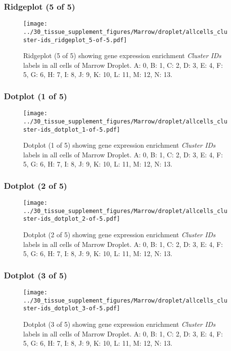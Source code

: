 \clearpage

\subsubsection{Ridgeplot (5 of 5)}
\begin{figure}[h]
\centering
\texttt{[image: ../30\_tissue\_supplement\_figures/Marrow/droplet/allcells\_cluster-ids\_ridgeplot\_5-of-5.pdf]}

\caption{ Ridgeplot (5 of 5)  showing gene expression enrichment \emph{Cluster IDs} labels in all cells of Marrow Droplet. A: 0, B: 1, C: 2, D: 3, E: 4, F: 5, G: 6, H: 7, I: 8, J: 9, K: 10, L: 11, M: 12, N: 13.}
\end{figure}


\clearpage

\subsubsection{Dotplot (1 of 5)}
\begin{figure}[h]
\centering
\texttt{[image: ../30\_tissue\_supplement\_figures/Marrow/droplet/allcells\_cluster-ids\_dotplot\_1-of-5.pdf]}

\caption{ Dotplot (1 of 5)  showing gene expression enrichment \emph{Cluster IDs} labels in all cells of Marrow Droplet. A: 0, B: 1, C: 2, D: 3, E: 4, F: 5, G: 6, H: 7, I: 8, J: 9, K: 10, L: 11, M: 12, N: 13.}
\end{figure}


\clearpage

\subsubsection{Dotplot (2 of 5)}
\begin{figure}[h]
\centering
\texttt{[image: ../30\_tissue\_supplement\_figures/Marrow/droplet/allcells\_cluster-ids\_dotplot\_2-of-5.pdf]}

\caption{ Dotplot (2 of 5)  showing gene expression enrichment \emph{Cluster IDs} labels in all cells of Marrow Droplet. A: 0, B: 1, C: 2, D: 3, E: 4, F: 5, G: 6, H: 7, I: 8, J: 9, K: 10, L: 11, M: 12, N: 13.}
\end{figure}


\clearpage

\subsubsection{Dotplot (3 of 5)}
\begin{figure}[h]
\centering
\texttt{[image: ../30\_tissue\_supplement\_figures/Marrow/droplet/allcells\_cluster-ids\_dotplot\_3-of-5.pdf]}

\caption{ Dotplot (3 of 5)  showing gene expression enrichment \emph{Cluster IDs} labels in all cells of Marrow Droplet. A: 0, B: 1, C: 2, D: 3, E: 4, F: 5, G: 6, H: 7, I: 8, J: 9, K: 10, L: 11, M: 12, N: 13.}
\end{figure}


